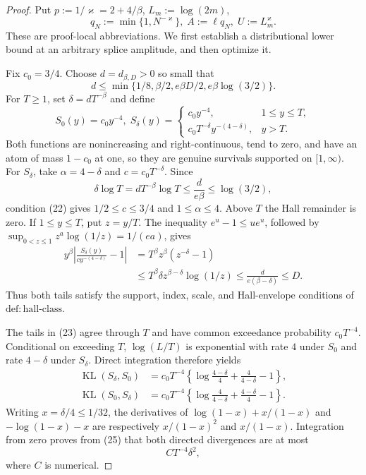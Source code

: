 \documentclass{article}
\begin{document}
\begin{proof}
Put \(p:=1/\varkappa=2+4/\beta\), \(L_m:=\log(2m)\),
\[
q_N:=\min\{1,N^{-\varkappa}\},\; A:=\ell q_N,
\; U:=L_m^{\varkappa}.
\]
These are proof-local abbreviations.  We first establish a distributional lower bound at an arbitrary splice amplitude, and then optimize it.

Fix \(c_0=3/4\).  Choose \(d=d_{\beta,D}>0\) so small that
\[
d\leq\min\{1/8,\beta/2,e\beta D/2,e\beta\log(3/2)\}.             \tag{22}
\]
For \(T\geq1\), set \(\delta=dT^{-\beta}\) and define
\[
S_0(y)=c_0y^{-4},\;
S_\delta(y)=
\begin{cases}
c_0y^{-4},&1\leq y\leq T,\\
c_0T^{-\delta}y^{-(4-\delta)},&y>T.
\end{cases}                                                       \tag{23}
\]
Both functions are nonincreasing and right-continuous, tend to zero, and have an atom of mass \(1-c_0\) at one, so they are genuine survivals supported on \([1,\infty)\).  For \(S_\delta\), take \(\alpha=4-\delta\) and \(c=c_0T^{-\delta}\).  Since
\[
\delta\log T=dT^{-\beta}\log T\leq\frac d{e\beta}\leq\log(3/2),
\]
condition (22) gives \(1/2\leq c\leq3/4\) and \(1\leq\alpha\leq4\).  Above \(T\) the Hall remainder is zero.  If \(1\leq y\leq T\), put \(z=y/T\).  The inequality \(e^u-1\leq ue^u\), followed by
\(\sup_{0<z\leq1}z^a\log(1/z)=1/(ea)\), gives
\[
\begin{split}
y^\beta\left|\frac{S_\delta(y)}{c y^{-(4-\delta)}}-1\right|
&=T^\beta z^\beta(z^{-\delta}-1)\\
&\leq T^\beta\delta z^{\beta-\delta}\log(1/z)
\leq\frac{d}{e(\beta-\delta)}\leq D.                            \tag{24}
\end{split}
\]
Thus both tails satisfy the support, index, scale, and Hall-envelope conditions of \(\mathrm{def{:}hall\text{-}class}\).

The tails in (23) agree through \(T\) and have common exceedance probability \(c_0T^{-4}\).  Conditional on exceeding \(T\), \(\log(L/T)\) is exponential with rate \(4\) under \(S_0\) and rate \(4-\delta\) under \(S_\delta\).  Direct integration therefore yields
\[
\begin{split}
\operatorname{KL}(S_\delta,S_0)
&=c_0T^{-4}\left\{\log\frac{4-\delta}{4}
+\frac4{4-\delta}-1\right\},\\
\operatorname{KL}(S_0,S_\delta)
&=c_0T^{-4}\left\{\log\frac4{4-\delta}
+\frac{4-\delta}{4}-1\right\}.
\end{split}                                                         \tag{25}
\]
Writing \(x=\delta/4\leq1/32\), the derivatives of
\(\log(1-x)+x/(1-x)\) and \(-\log(1-x)-x\) are respectively
\(x/(1-x)^2\) and \(x/(1-x)\).  Integration from zero proves from (25) that both directed divergences are at most
\[
C T^{-4}\delta^2,                                                   \tag{26}
\]
where \(C\) is numerical.


\end{proof}
\end{document}
